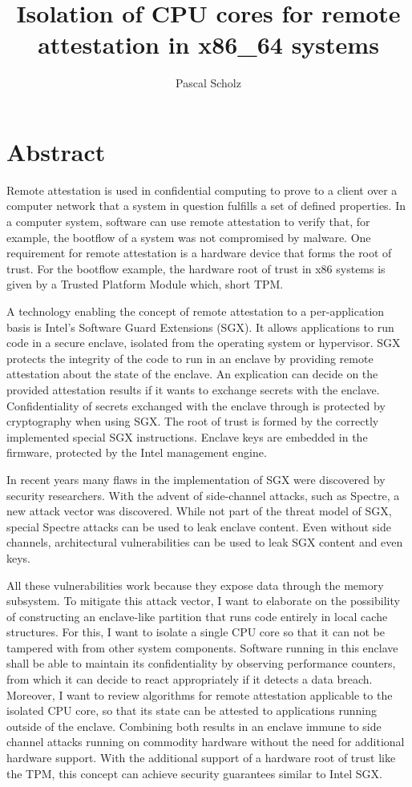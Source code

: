 \documentclass{article}
\title{Isolation of CPU cores for remote attestation in x86\_64 systems}
\author{Pascal Scholz}
\begin{document}
\maketitle

\section{Abstract}
Remote attestation is used in confidential computing to prove to a client over a computer network that a system in
question fulfills a set of defined properties. In a computer system, software can use remote attestation to verify
that, for example, the bootflow of a system was not compromised by malware. One requirement for remote attestation
is a hardware device that forms the root of trust\cite{coker2011principles}. For the bootflow example, the hardware
root of trust in x86 systems is given by a Trusted Platform Module which, short TPM.

A technology enabling the concept of remote attestation to a per-application basis is Intel's Software Guard
Extensions (SGX). It allows applications to run code in a secure enclave, isolated from the operating system or
hypervisor. SGX protects the integrity of the code to run in an enclave by providing remote attestation about the state
of the enclave. An explication can decide on the provided attestation results if it wants to exchange secrets with the
enclave. Confidentiality of secrets exchanged with the enclave through is protected by cryptography when using
SGX. The root of trust is formed by the correctly implemented special SGX instructions.
Enclave keys are embedded in the firmware, protected by the Intel management engine.\cite{costan2016intel}

In recent years many flaws in the implementation of SGX were discovered by security researchers. With the advent
of side-channel attacks, such as Spectre, a new attack vector was discovered. While not part of the threat model
of SGX, special Spectre attacks can be used to leak enclave content.\cite{chen2019sgxpectre, van2018foreshadow}
Even without side channels, architectural vulnerabilities can be used to leak SGX content and even keys.\cite{borrello2022aepic}

All these vulnerabilities work because they expose data through the memory subsystem. To mitigate this attack vector, I
want to elaborate on the possibility of constructing an enclave-like partition that runs code entirely in local cache
structures. For this, I want to isolate a single CPU core so that it can not be tampered with from other system
components. Software running in this enclave shall be able to maintain its confidentiality by observing
performance counters, from which it can decide to react appropriately if it detects a data breach. Moreover, I want to
review algorithms for remote attestation applicable to the isolated CPU core, so that its state can be attested to
applications running outside of the enclave. Combining both results in an enclave
immune to side channel attacks running on commodity hardware without
the need for additional hardware support. With the additional support of a hardware root of trust like the TPM, this
concept can achieve security guarantees similar to Intel SGX.



\end{document}
